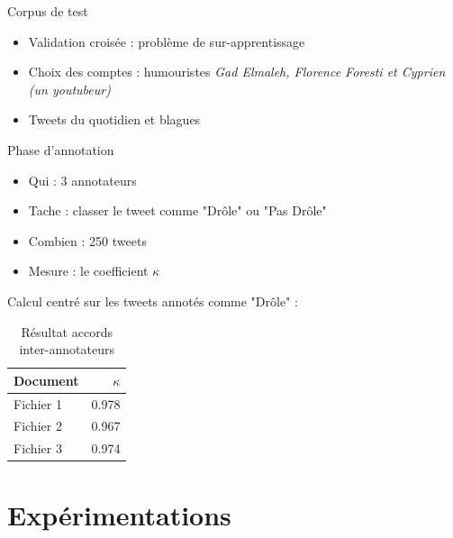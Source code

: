 \documentclass{beamer}
\begin{document}
\begin{frame}[allowframebreaks]{Corpus de test}


\begin{itemize}
  \item Validation croisée : problème de sur-apprentissage
  \item Choix des comptes : humouristes \textit{Gad Elmaleh,
Florence Foresti et Cyprien (un youtubeur)} 
  \item Tweets du quotidien et blagues 
\end{itemize}

\begin{block}{Phase d'annotation}
\begin{itemize}
\item Qui : 3 annotateurs
\item Tache : classer le tweet comme "Drôle" ou "Pas Drôle"
\item Combien : 250 tweets
\item Mesure : le coefficient $\kappa$
\end{itemize}
\end{block}

\vspace*{0.4cm}
Calcul centré sur les tweets annotés comme "Drôle" : 
\vspace*{0.2cm}
\begin{table}[!h]
\centering
	\begin{tabular}{lr}
	\toprule
	 Document & $\kappa$ \\
	\midrule
	  Fichier 1 & 0.978 \\
	  Fichier 2 &  0.967\\
	  Fichier 3 & 0.974  \\
	\bottomrule
	\end{tabular}
\caption{Résultat accords inter-annotateurs}
\label{anno}
\end{table}

\end{frame}






\section{Expérimentations}
\end{document}
